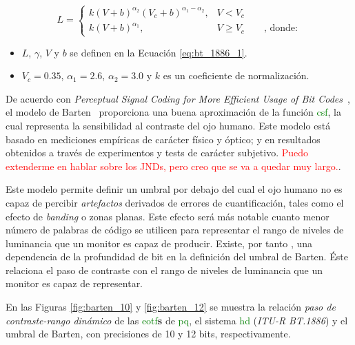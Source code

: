 \documentclass[a4paper, 12pt]{report}
\begin{document}
\footnotesize
\begin{equation} \label{eq:bt_1886_2}
    L=%
    \begin{cases}
        k (V + b)^{\alpha_{2}} (V_{c} + b)^{\alpha_{1} - \alpha_{2}}, &  V < V_{c}\\
        k (V + b)^{\alpha_{1}} , &  V \geq V_{c}\qquad\textrm{, donde:}
    \end{cases}
\end{equation}

\begin{itemize}
    \item $L$, $\gamma$, $V$ y $b$ se definen en la Ecuación \ref{eq:bt_1886_1}.
    \item  $V_{c}=0.35$, $\alpha_{1}=2.6$, $\alpha_{2}=3.0$ y $k$ es un coeficiente de normalización.
\end{itemize}

\normalsize
De acuerdo con \textit{Perceptual Signal Coding for More Efficient Usage of Bit Codes}~\cite{smpte:_barten}, el modelo de Barten~\cite{csf:_barten_1,csf:_barten_2} proporciona una buena aproximación  de la función \textcolor{green}{csf}, la cual representa la sensibilidad al contraste del ojo humano. Este modelo está basado en mediciones empíricas de carácter físico y óptico; y en resultados obtenidos a través de experimentos y tests de carácter subjetivo. \textcolor{red}{Puedo extenderme en hablar sobre los JNDs, pero creo que se va a quedar muy largo.}.

Este modelo permite definir un umbral por debajo del cual el ojo humano no es capaz de percibir \textit{artefactos} derivados de errores de cuantificación, tales como el efecto  de \textit{banding} o zonas planas. Este efecto será más notable cuanto menor número de palabras de código se utilicen para representar el rango de niveles de luminancia que un monitor es capaz de producir. Existe, por tanto , una dependencia de la profundidad de bit en la definición del umbral de Barten. Éste relaciona el paso de contraste con el rango de niveles de luminancia que un monitor es capaz de representar. 


En las Figuras \ref{fig:barten_10} y \ref{fig:barten_12}  se muestra la relación \textit{paso de contraste-rango dinámico} de las \textcolor{green}{eotf}\textbf{s} de \textcolor{green}{pq}, el sistema \textcolor{green}{hd} (\textit{ITU-R BT.1886}) y el umbral de Barten, con precisiones de 10 y 12 bits, respectivamente.
\end{document}
